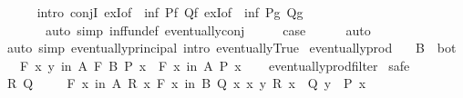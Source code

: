 \begin{isabellebody}
\ \ \ \ \isamarkupfalse%
\ {\isacharparenleft}{\kern0pt}intro\ conjI\ exI{\isacharbrackleft}{\kern0pt}of\ {\isacharunderscore}{\kern0pt}\ {\isachardoublequoteopen}inf\ Pf\ Qf{\isachardoublequoteclose}{\isacharbrackright}{\kern0pt}\ exI{\isacharbrackleft}{\kern0pt}of\ {\isacharunderscore}{\kern0pt}\ {\isachardoublequoteopen}inf\ Pg\ Qg{\isachardoublequoteclose}{\isacharbrackright}{\kern0pt}{\isacharparenright}{\kern0pt}\isanewline
\ \ \ \ \ \ \ {\isacharparenleft}{\kern0pt}auto\ simp{\isacharcolon}{\kern0pt}\ inf{\isacharunderscore}{\kern0pt}fun{\isacharunderscore}{\kern0pt}def\ eventually{\isacharunderscore}{\kern0pt}conj{\isacharparenright}{\kern0pt}\isanewline
\ \ \isamarkupfalse%
\ \isamarkupfalse%
\ {\isacharquery}{\kern0pt}case\isanewline
\ \ \ \ \isamarkupfalse%
\ auto\isanewline
{}\isamarkupfalse%
\ {\isacharparenleft}{\kern0pt}auto\ simp{\isacharcolon}{\kern0pt}\ eventually{\isacharunderscore}{\kern0pt}principal\ intro{\isacharcolon}{\kern0pt}\ eventually{\isacharunderscore}{\kern0pt}True{\isacharparenright}{\kern0pt}%
\endisatagproof
{\isafoldproof}%
%
\isadelimproof
\isanewline
%
\endisadelimproof
\isanewline
{}\isamarkupfalse%
\ eventually{\isacharunderscore}{\kern0pt}prod{}{\isacharcolon}{\kern0pt}\isanewline
\ \ \ {\isachardoublequoteopen}B\ {\isasymnoteq}\ bot{\isachardoublequoteclose}\isanewline
\ \ \ {\isachardoublequoteopen}{\isacharparenleft}{\kern0pt}{\isasymforall}\isactrlsub F\ {\isacharparenleft}{\kern0pt}x{\isacharcomma}{\kern0pt}\ y{\isacharparenright}{\kern0pt}\ in\ A\ {\isasymtimes}\isactrlsub F\ B{\isachardot}{\kern0pt}\ P\ x{\isacharparenright}{\kern0pt}\ {\isasymlongleftrightarrow}\ {\isacharparenleft}{\kern0pt}{\isasymforall}\isactrlsub F\ x\ in\ A{\isachardot}{\kern0pt}\ P\ x{\isacharparenright}{\kern0pt}{\isachardoublequoteclose}\isanewline
%
\isadelimproof
\ \ %
\endisadelimproof
%
\isatagproof
{}\isamarkupfalse%
\ eventually{\isacharunderscore}{\kern0pt}prod{\isacharunderscore}{\kern0pt}filter\isanewline
{}\isamarkupfalse%
\ safe\isanewline
\ \ \isamarkupfalse%
\ R\ Q\isanewline
\ \ \isamarkupfalse%
\ {\isacharasterisk}{\kern0pt}{\isacharcolon}{\kern0pt}\ {\isachardoublequoteopen}{\isasymforall}\isactrlsub F\ x\ in\ A{\isachardot}{\kern0pt}\ R\ x{\isachardoublequoteclose}\ {\isachardoublequoteopen}{\isasymforall}\isactrlsub F\ x\ in\ B{\isachardot}{\kern0pt}\ Q\ x{\isachardoublequoteclose}\ {\isachardoublequoteopen}{\isasymforall}x\ y{\isachardot}{\kern0pt}\ R\ x\ {\isasymlongrightarrow}\ Q\ y\ {\isasymlongrightarrow}\ P\ x{\isachardoublequoteclose}\isanewline

\end{isabellebody}
